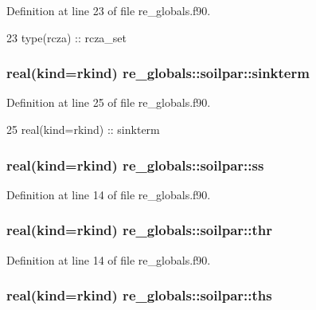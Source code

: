 Definition at line 23 of file re\+\_\+globals.\+f90.


\begin{DoxyCode}
23     \textcolor{keywordtype}{type}(rcza)       :: rcza\_set
\end{DoxyCode}
\subsubsection[{sinkterm}]{\setlength{\rightskip}{0pt plus 5cm}real(kind=rkind) re\+\_\+globals\+::soilpar\+::sinkterm}\label{structre__globals_1_1soilpar_ae8e3a61b1dc7267af5f0dbb47bc117d4}


Definition at line 25 of file re\+\_\+globals.\+f90.


\begin{DoxyCode}
25     \textcolor{keywordtype}{real(kind=rkind)} :: sinkterm
\end{DoxyCode}
\subsubsection[{ss}]{\setlength{\rightskip}{0pt plus 5cm}real(kind=rkind) re\+\_\+globals\+::soilpar\+::ss}\label{structre__globals_1_1soilpar_adcf52b57e7df61a84a908eade40d5b3c}


Definition at line 14 of file re\+\_\+globals.\+f90.

\subsubsection[{thr}]{\setlength{\rightskip}{0pt plus 5cm}real(kind=rkind) re\+\_\+globals\+::soilpar\+::thr}\label{structre__globals_1_1soilpar_a305065d3d7c267a2e6e600e217ace4d9}


Definition at line 14 of file re\+\_\+globals.\+f90.

\subsubsection[{ths}]{\setlength{\rightskip}{0pt plus 5cm}real(kind=rkind) re\+\_\+globals\+::soilpar\+::ths}\label{structre__globals_1_1soilpar_a6ce7ee8aaf86cbcf4188d0fb08f79bcb}


